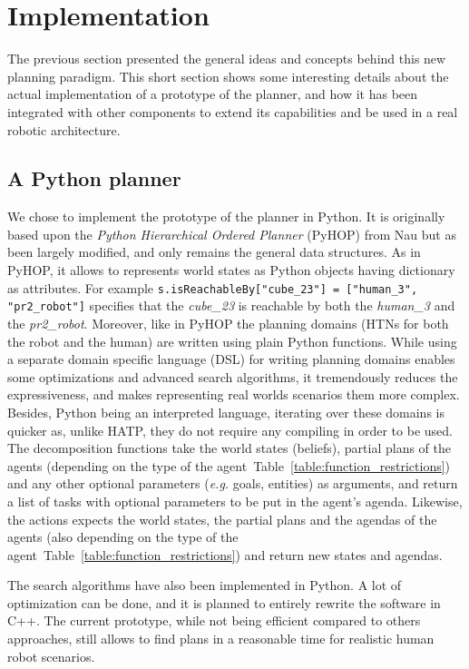 \documentclass[a4paper,11pt,twoside]{StyleThese}
\begin{document}
\section{Implementation}
The previous section presented the general ideas and concepts behind this new planning paradigm. This short section shows some interesting details about the actual implementation of a prototype of the planner, and how it has been integrated with other components to extend its capabilities and be used in a real robotic architecture.

\subsection{A Python planner}
We chose to implement the prototype of the planner in Python. It is originally based upon the \textit{Python Hierarchical Ordered Planner} (PyHOP) from Nau but as been largely modified, and only remains the general data structures. As in PyHOP, it allows to represents world states as Python objects having dictionary as attributes. For example \verb|s.isReachableBy["cube_23"] = ["human_3", "pr2_robot"]| specifies that the \textit{cube\_23} is reachable by both the \textit{human\_3} and the \textit{pr2\_robot}.
Moreover, like in PyHOP the planning domains (HTNs for both the robot and the human) are written using plain Python functions. While using a separate domain specific language (DSL) for writing planning domains enables some optimizations and advanced search algorithms, it tremendously reduces the expressiveness, and makes representing real worlds scenarios them more complex. Besides, Python being an interpreted language, iterating over these domains is quicker as, unlike HATP, they do not require any compiling in order to be used.
The decomposition functions take the world states (beliefs), partial plans of the agents (depending on the type of the agent~Table~\ref{table:function_restrictions}) and any other optional parameters (\textit{e.g.} goals, entities) as arguments, and return a list of tasks with optional parameters to be put in the agent's agenda. Likewise, the actions expects the world states, the partial plans and the agendas of the agents (also depending on the type of the agent~Table~\ref{table:function_restrictions}) and return new states and agendas.

The search algorithms have also been implemented in Python. A lot of optimization can be done, and it is planned to entirely rewrite the software in C++. The current prototype, while not being efficient compared to others approaches, still allows to find plans in a reasonable time for realistic human robot scenarios.
\end{document}
